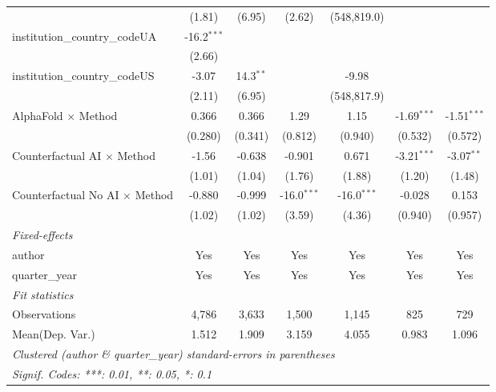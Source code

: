 \begin{tabular}{lcccccc}
                                         & (1.81)        & (6.95)        & (2.62)        & (548,819.0)   &               &   \\   
   institution\_country\_codeUA          & -16.2$^{***}$ &               &               &               &               &   \\   
                                         & (2.66)        &               &               &               &               &   \\   
   institution\_country\_codeUS          & -3.07         & 14.3$^{**}$   &               & -9.98         &               &   \\   
                                         & (2.11)        & (6.95)        &               & (548,817.9)   &               &   \\   
   AlphaFold $\times$ Method             & 0.366         & 0.366         & 1.29          & 1.15          & -1.69$^{***}$ & -1.51$^{***}$\\   
                                         & (0.280)       & (0.341)       & (0.812)       & (0.940)       & (0.532)       & (0.572)\\   
   Counterfactual AI $\times$ Method     & -1.56         & -0.638        & -0.901        & 0.671         & -3.21$^{***}$ & -3.07$^{**}$\\   
                                         & (1.01)        & (1.04)        & (1.76)        & (1.88)        & (1.20)        & (1.48)\\   
   Counterfactual No AI $\times$ Method  & -0.880        & -0.999        & -16.0$^{***}$ & -16.0$^{***}$ & -0.028        & 0.153\\   
                                         & (1.02)        & (1.02)        & (3.59)        & (4.36)        & (0.940)       & (0.957)\\   
   \midrule
   \emph{Fixed-effects}\\
   author                                & Yes           & Yes           & Yes           & Yes           & Yes           & Yes\\  
   quarter\_year                         & Yes           & Yes           & Yes           & Yes           & Yes           & Yes\\  
   \midrule
   \emph{Fit statistics}\\
   Observations                          & 4,786         & 3,633         & 1,500         & 1,145         & 825           & 729\\  
Mean(Dep. Var.) & 1.512 & 1.909 & 3.159 & 4.055 & 0.983 & 1.096 \\
   \midrule \midrule
   \multicolumn{7}{l}{\emph{Clustered (author \& quarter\_year) standard-errors in parentheses}}\\
   \multicolumn{7}{l}{\emph{Signif. Codes: ***: 0.01, **: 0.05, *: 0.1}}\\
\end{tabular}
\par\endgroup

